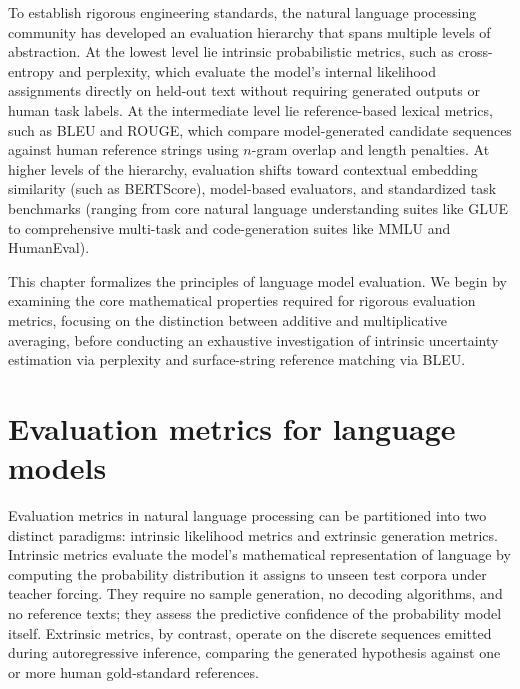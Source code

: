 \documentclass[../../main.tex]{subfiles}
\begin{document}
To establish rigorous engineering standards, the natural language processing community has developed an evaluation hierarchy that spans multiple levels of abstraction. At the lowest level lie intrinsic probabilistic metrics, such as cross-entropy and perplexity, which evaluate the model's internal likelihood assignments directly on held-out text without requiring generated outputs or human task labels. At the intermediate level lie reference-based lexical metrics, such as BLEU and ROUGE, which compare model-generated candidate sequences against human reference strings using $n$-gram overlap and length penalties. At higher levels of the hierarchy, evaluation shifts toward contextual embedding similarity (such as BERTScore), model-based evaluators, and standardized task benchmarks (ranging from core natural language understanding suites like GLUE to comprehensive multi-task and code-generation suites like MMLU and HumanEval).

This chapter formalizes the principles of language model evaluation. We begin by examining the core mathematical properties required for rigorous evaluation metrics, focusing on the distinction between additive and multiplicative averaging, before conducting an exhaustive investigation of intrinsic uncertainty estimation via perplexity and surface-string reference matching via BLEU.

\clearpage

\section{Evaluation metrics for language models}
\label{sec:evaluation_metrics}

Evaluation metrics in natural language processing can be partitioned into two distinct paradigms: intrinsic likelihood metrics and extrinsic generation metrics. Intrinsic metrics evaluate the model's mathematical representation of language by computing the probability distribution it assigns to unseen test corpora under teacher forcing. They require no sample generation, no decoding algorithms, and no reference texts; they assess the predictive confidence of the probability model itself. Extrinsic metrics, by contrast, operate on the discrete sequences emitted during autoregressive inference, comparing the generated hypothesis against one or more human gold-standard references.
\end{document}
